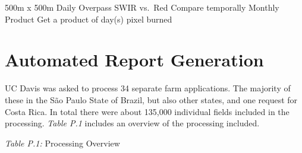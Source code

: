 \documentclass[]{article}
\begin{document}
500m x 500m Daily Overpass SWIR vs.~Red Compare temporally Monthly
Product Get a product of day(s) pixel burned

\section{Automated Report
Generation}\label{automated-report-generation-1}

UC Davis was asked to process 34 separate farm applications. The
majority of these in the São Paulo State of Brazil, but also other
states, and one request for Costa Rica. In total there were about
135,000 individual fields included in the processing. \emph{Table P.1}
includes an overview of the processing included.

\emph{Table P.1:} Processing Overview
\end{document}
